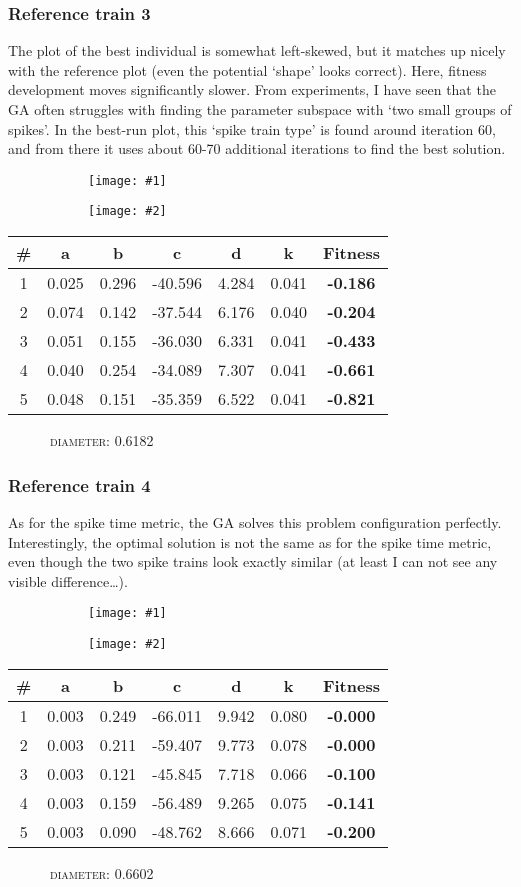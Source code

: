 \documentclass[a4paper,9pt]{article}
\newcommand{\tightit}{\vspace{-5pt}}
\newcommand{\casedata}[4]{
    \begin{figure}[!h]
        \centering
        \begin{subfigure}{.5\textwidth}
          \centering
          \texttt{[image: \#1]}
        \end{subfigure}%
        \begin{subfigure}{.5\textwidth}
          \centering
          \texttt{[image: \#2]}
        \end{subfigure}
    \end{figure}

    { \scriptsize
    \begin{tabular}{c|c|c|c|c|c||c}
    \textbf{\#} & \textbf{a} & \textbf{b} & \textbf{c} & 
      \textbf{d} & \textbf{k} & \textbf{Fitness} \\ \hline
      #3
    \end{tabular} 
    \textsc{~~~~~~diameter:} #4
    \ \\
    }
}
\begin{document}
\subsubsection{Reference train 3}
\tightit
The plot of the best individual is somewhat left-skewed, but it matches up
nicely with the reference plot (even the potential `shape' looks correct).
Here, fitness development moves significantly slower. From experiments, I have
seen that the GA often struggles with finding the parameter subspace with `two
small groups of spikes'. In the best-run plot, this `spike train type' is
found around iteration 60, and from there it uses about 60-70 additional
iterations to find the best solution.

\casedata{../data/izzy-train3.dat_spike-interval_4.png}
         {../data/izzy-train3.dat_spike-interval_4.dev.png}
         {
1 & 0.025 & 0.296 & -40.596 & 4.284 & 0.041 &\textbf{-0.186} \\ \hline
2 & 0.074 & 0.142 & -37.544 & 6.176 & 0.040 &\textbf{-0.204} \\ \hline
3 & 0.051 & 0.155 & -36.030 & 6.331 & 0.041 &\textbf{-0.433} \\ \hline
4 & 0.040 & 0.254 & -34.089 & 7.307 & 0.041 &\textbf{-0.661} \\ \hline
5 & 0.048 & 0.151 & -35.359 & 6.522 & 0.041 &\textbf{-0.821} \\ \hline
         }
         {0.6182}

\clearpage

\subsubsection{Reference train 4}
\tightit
As for the spike time metric, the GA solves this problem configuration
perfectly. Interestingly, the optimal solution is not the same as for the
spike time metric, even though the two spike trains look exactly similar (at
least I can not see any visible difference\ldots). 

\casedata{../data/izzy-train4.dat_spike-interval_4.png}
         {../data/izzy-train4.dat_spike-interval_4.dev.png}
         {
1 & 0.003 & 0.249 & -66.011 & 9.942 & 0.080 &\textbf{-0.000} \\ \hline
2 & 0.003 & 0.211 & -59.407 & 9.773 & 0.078 &\textbf{-0.000} \\ \hline
3 & 0.003 & 0.121 & -45.845 & 7.718 & 0.066 &\textbf{-0.100} \\ \hline
4 & 0.003 & 0.159 & -56.489 & 9.265 & 0.075 &\textbf{-0.141} \\ \hline
5 & 0.003 & 0.090 & -48.762 & 8.666 & 0.071 &\textbf{-0.200} \\ \hline
         }
         {0.6602}
\end{document}
